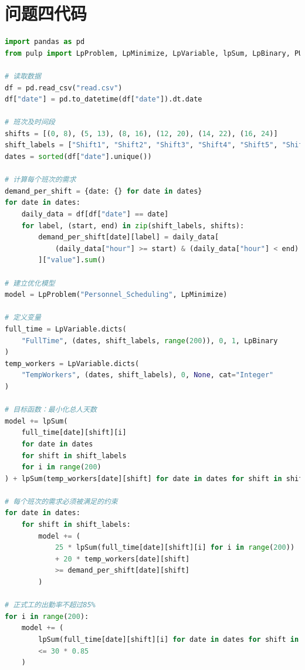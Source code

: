 \documentclass[UTF8,a4paper,10 pt]{article}%
\begin{document}
\section{问题四代码}
\begin{lstlisting}[language=python]
import pandas as pd
from pulp import LpProblem, LpMinimize, LpVariable, lpSum, LpBinary, PULP_CBC_CMD

# 读取数据
df = pd.read_csv("read.csv")
df["date"] = pd.to_datetime(df["date"]).dt.date

# 班次及时间段
shifts = [(0, 8), (5, 13), (8, 16), (12, 20), (14, 22), (16, 24)]
shift_labels = ["Shift1", "Shift2", "Shift3", "Shift4", "Shift5", "Shift6"]
dates = sorted(df["date"].unique())

# 计算每个班次的需求
demand_per_shift = {date: {} for date in dates}
for date in dates:
    daily_data = df[df["date"] == date]
    for label, (start, end) in zip(shift_labels, shifts):
        demand_per_shift[date][label] = daily_data[
            (daily_data["hour"] >= start) & (daily_data["hour"] < end)
        ]["value"].sum()

# 建立优化模型
model = LpProblem("Personnel_Scheduling", LpMinimize)

# 定义变量
full_time = LpVariable.dicts(
    "FullTime", (dates, shift_labels, range(200)), 0, 1, LpBinary
)
temp_workers = LpVariable.dicts(
    "TempWorkers", (dates, shift_labels), 0, None, cat="Integer"
)

# 目标函数：最小化总人天数
model += lpSum(
    full_time[date][shift][i]
    for date in dates
    for shift in shift_labels
    for i in range(200)
) + lpSum(temp_workers[date][shift] for date in dates for shift in shift_labels)

# 每个班次的需求必须被满足的约束
for date in dates:
    for shift in shift_labels:
        model += (
            25 * lpSum(full_time[date][shift][i] for i in range(200))
            + 20 * temp_workers[date][shift]
            >= demand_per_shift[date][shift]
        )

# 正式工的出勤率不超过85%
for i in range(200):
    model += (
        lpSum(full_time[date][shift][i] for date in dates for shift in shift_labels)
        <= 30 * 0.85
    )


\end{lstlisting}
\end{document}
